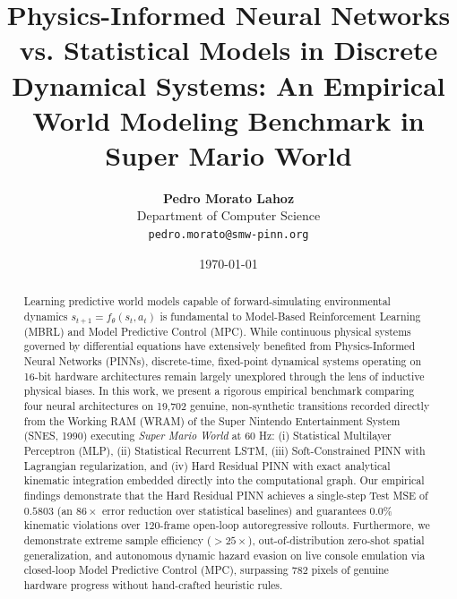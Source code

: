 \documentclass[10pt,twocolumn,letterpaper]{article}
\title{\textbf{Physics-Informed Neural Networks vs. Statistical Models in Discrete Dynamical Systems: An Empirical World Modeling Benchmark in Super Mario World}}
\author{
  \textbf{Pedro Morato Lahoz} \\
  Department of Computer Science \\
  \texttt{pedro.morato@smw-pinn.org}
}
\date{\today}
\begin{document}
\maketitle

\begin{abstract}
Learning predictive world models capable of forward-simulating environmental dynamics $s_{t+1} = f_\theta(s_t, a_t)$ is fundamental to Model-Based Reinforcement Learning (MBRL) and Model Predictive Control (MPC). While continuous physical systems governed by differential equations have extensively benefited from Physics-Informed Neural Networks (PINNs), discrete-time, fixed-point dynamical systems operating on 16-bit hardware architectures remain largely unexplored through the lens of inductive physical biases. In this work, we present a rigorous empirical benchmark comparing four neural architectures on 19,702 genuine, non-synthetic transitions recorded directly from the Working RAM (WRAM) of the Super Nintendo Entertainment System (SNES, 1990) executing \textit{Super Mario World} at 60 Hz: (i) Statistical Multilayer Perceptron (MLP), (ii) Statistical Recurrent LSTM, (iii) Soft-Constrained PINN with Lagrangian regularization, and (iv) Hard Residual PINN with exact analytical kinematic integration embedded directly into the computational graph. Our empirical findings demonstrate that the Hard Residual PINN achieves a single-step Test MSE of $0.5803$ (an $86\times$ error reduction over statistical baselines) and guarantees $0.0\%$ kinematic violations over 120-frame open-loop autoregressive rollouts. Furthermore, we demonstrate extreme sample efficiency ($>25\times$), out-of-distribution zero-shot spatial generalization, and autonomous dynamic hazard evasion on live console emulation via closed-loop Model Predictive Control (MPC), surpassing 782 pixels of genuine hardware progress without hand-crafted heuristic rules.
\end{abstract}
\end{document}
